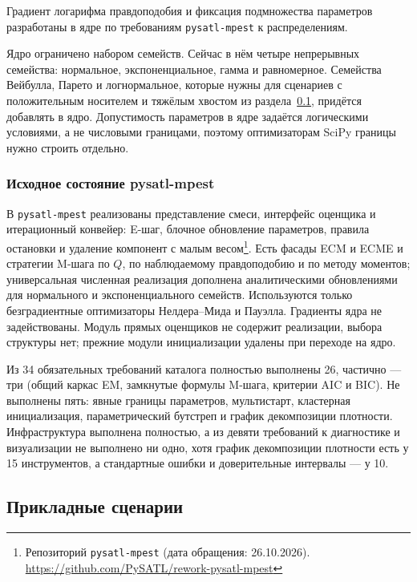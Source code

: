 Градиент логарифма правдоподобия и фиксация подмножества параметров разработаны в ядре по требованиям \texttt{pysatl-mpest} к распределениям.

Ядро ограничено набором семейств. Сейчас в нём четыре непрерывных семейства: нормальное, экспоненциальное, гамма и равномерное. Семейства Вейбулла, Парето и логнормальное, которые нужны для сценариев с положительным носителем и тяжёлым хвостом из раздела~\ref{sec:review-scenarios}, придётся добавлять в ядро. Допустимость параметров в ядре задаётся логическими условиями, а не числовыми границами, поэтому оптимизаторам SciPy границы нужно строить отдельно.

\subsubsection{Исходное состояние pysatl-mpest}
\label{sec:mpest-initial}

В \texttt{pysatl-mpest} реализованы представление смеси, интерфейс оценщика и итерационный конвейер: E-шаг, блочное обновление параметров, правила остановки и удаление компонент с малым весом\footnote{Репозиторий \texttt{pysatl-mpest} (дата обращения: 26.10.2026). \url{https://github.com/PySATL/rework-pysatl-mpest}}. Есть фасады ECM и ECME и стратегии M-шага по $Q$, по наблюдаемому правдоподобию и по методу моментов; универсальная численная реализация дополнена аналитическими обновлениями для нормального и экспоненциального семейств. Используются только безградиентные оптимизаторы Нелдера--Мида и Пауэлла. Градиенты ядра не задействованы. Модуль прямых оценщиков не содержит реализации, выбора структуры нет; прежние модули инициализации удалены при переходе на ядро.

Из 34 обязательных требований каталога полностью выполнены 26, частично --- три (общий каркас EM, замкнутые формулы M-шага, критерии AIC и BIC). Не выполнены пять: явные границы параметров, мультистарт, кластерная инициализация, параметрический бутстреп и график декомпозиции плотности. Инфраструктура выполнена полностью, а из девяти требований к диагностике и визуализации не выполнено ни одно, хотя график декомпозиции плотности есть у 15 инструментов, а стандартные ошибки и доверительные интервалы --- у 10.

\subsection{Прикладные сценарии}
\label{sec:review-scenarios}


